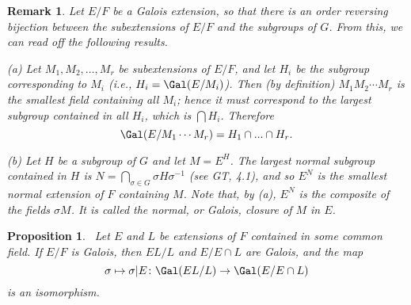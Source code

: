 \documentclass[a4paper,11pt,final,openany]{memoir}
\newtheorem{proposition}[X]{Proposition}
\newtheorem{remark}[X]{Remark}
\theoremstyle{nonumberplain}
\begin{document}
\begin{remark}
\label{ft18}Let $E/F$ be a Galois extension, so that there is an order
reversing bijection between the subextensions of $E/F$ and the subgroups of
$G$. From this, we can read off the following results.

(a) Let $M_{1},M_{2},\ldots,M_{r}$ be subextensions of $E/F$, and let $H_{i}$
be the subgroup corresponding to $M_{i}$ (i.e., $H_{i}=\Gal(E/M_{i})$). Then
(by definition) $M_{1}M_{2}\cdots M_{r}$ is the smallest field containing all
$M_{i}$; hence it must correspond to the largest subgroup contained in all
$H_{i}$, which is $\bigcap H_{i}$. Therefore
\[
\Gal(E/M_{1}\cdots M_{r})=H_{1}\cap...\cap H_{r}.
\]


(b) Let $H$ be a subgroup of $G$ and let $M=E^{H}$. The largest normal
subgroup contained in $H$ is $N=\bigcap\nolimits_{\sigma\in G}\sigma
H\sigma^{-1}$ (see GT, 4.1), and so $E^{N}$ is the smallest normal
extension of $F$ containing $M$. Note that, by (a), $E^{N}$ is the composite
of the fields $\sigma M$. It is called the \emph{normal}, or \emph{Galois},
closure of $M$ in $E$.%
%
%

\end{remark}

\begin{proposition}
\label{ft18f}\ Let $E$ and $L$ be extensions of $F$ contained in some common
field. If $E/F$ is Galois, then $EL/L$ and $E/E\cap L$ are Galois, and the
map
\[
\sigma\mapsto\sigma|E\colon\Gal(EL/L)\rightarrow\Gal(E/E\cap L)
\]
is an isomorphism.
\end{proposition}
\end{document}
